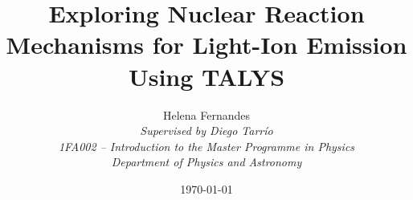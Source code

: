 
\usepackage[english]{babel}
\usepackage[utf8]{inputenc}
\usepackage[T1]{fontenc}
\usepackage[margin=2.5cm]{geometry}

\usepackage{amsmath}
\usepackage{amssymb}
\usepackage{mathtools}
\usepackage{bm}
\usepackage{mhchem}
\usepackage{cancel}


\newif\ifdraftfigs
\draftfigsfalse %

\ifdraftfigs
  \PassOptionsToPackage{draft}{graphicx}
\fi

\usepackage{graphicx}

\usepackage{float}
\usepackage{booktabs}
\usepackage{tabularx}

\usepackage[
  labelsep=period,
  figurename=Figure,
  tablename=Table,
  labelfont=bf
]{caption}
\usepackage{subcaption}


\usepackage{siunitx}
\usepackage{gensymb}


\usepackage{setspace}
\usepackage{indentfirst}
\usepackage[x11names]{xcolor}
\usepackage{wasysym}
\onehalfspacing

\usepackage[toc,page]{appendix}
\usepackage[nottoc]{tocbibind}

\usepackage[numbers,square]{natbib}


\usepackage{needspace}

\newcommand{\Epar}[1]{%
  \Needspace{0.25\textheight}%
  \paragraph{#1}\mbox{}\par\smallskip
}


\usepackage{fancyhdr}
\pagestyle{fancy}
\fancyhf{}
\fancyhead[R]{\nouppercase{\rightmark}}
\fancyfoot[C]{\thepage}

\makeatletter
\renewcommand{\sectionmark}[1]{%
  \markright{\thesection.\ #1}%
}
\renewcommand\@seccntformat[1]{%
  \csname the#1\endcsname.\quad
}
\makeatother


\usepackage{hyperref}
\usepackage{bookmark}
\usepackage[nameinlink,capitalise,noabbrev]{cleveref}

\hypersetup{
  colorlinks=true,
  linkcolor=blue,
  citecolor=blue,
  urlcolor=blue
}


\title{\textbf{Exploring Nuclear Reaction Mechanisms for Light-Ion Emission Using TALYS}}

\author{
Helena Fernandes\\[1cm]
\emph{Supervised by Diego Tarrío}\\[1cm]
\emph{1FA002 -- Introduction to the Master Programme in Physics}\\[1cm]
\emph{Department of Physics and Astronomy}
}

\date{\today}


